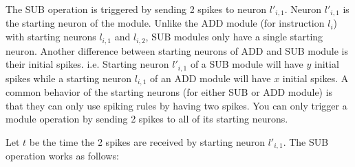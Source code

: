 \documentclass[smallextended]{svjour3}
\begin{document}
The SUB operation is triggered by sending 2 spikes to neuron $l'_{i,1}$. Neuron $l'_{i,1}$ is the starting neuron of the module. Unlike the ADD
module (for instruction $l_i$) with starting neurons $l_{i,1}$ and $l_{i,2}$, SUB modules only have a single starting neuron. Another difference 
between starting neurons of ADD and SUB module is their initial spikes. i.e. Starting neuron $l'_{i,1}$ of a SUB module will have $y$ initial
spikes while a starting neuron $l_{i,1}$ of an ADD module will have $x$ initial spikes. A common behavior of the starting neurons (for either SUB 
or ADD module) is that they can only use spiking rules by having two spikes. You can only trigger a module operation by sending 2 spikes to all
of its starting neurons.

Let $t$ be the time the 2 spikes are received by starting neuron $l'_{i,1}$. The SUB operation works as follows:
\end{document}
